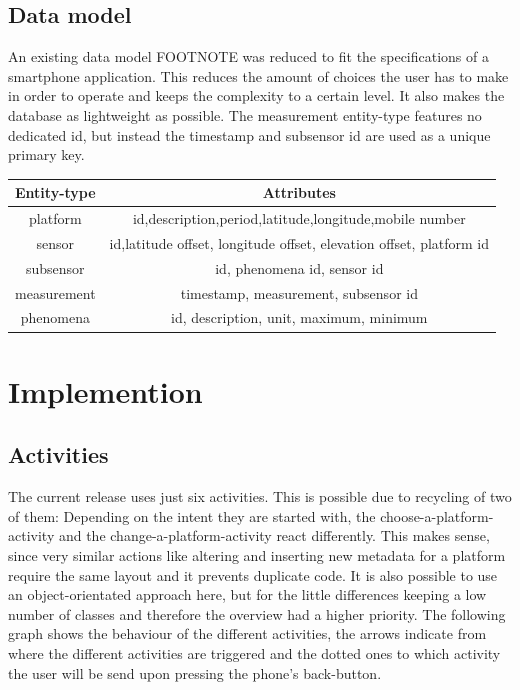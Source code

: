 \documentclass[11pt,oneside,a4paper]{scrartcl}
\begin{document}
\subsection{Data model}
An existing data model  FOOTNOTE was reduced to fit the specifications of a smartphone application. This reduces the amount of choices the user has to make in order to operate and keeps the complexity to a certain level. It also makes the database as lightweight as possible. The measurement entity-type features no dedicated id, but instead the timestamp and subsensor id are used as a unique primary key.

\begin{center}
\begin{tabular}{|c|c|}
\hline \textbf{ Entity-type} &  \textbf{Attributes} \\ 
\hline platform & id,description,period,latitude,longitude,mobile number \\ 
\hline sensor & id,latitude offset, longitude offset, elevation offset, platform id \\ 
\hline subsensor & id, phenomena id, sensor id \\ 
\hline measurement & timestamp, measurement, subsensor id \\ 
\hline phenomena & id, description, unit, maximum, minimum \\ 
\hline 
\end{tabular} 
\end{center}


\section{Implemention}
\subsection{Activities}
The current release uses just six activities. This is possible due to recycling of two of them: Depending on the intent they are started with, the choose-a-platform-activity and the change-a-platform-activity react differently. This makes sense, since very similar actions like altering and inserting new metadata for a platform require the same layout and it prevents duplicate code. It is also possible to use an object-orientated approach here, but for the little differences keeping a low number of classes and therefore the overview had a higher priority.
The following graph shows the behaviour of the different activities, the arrows indicate from where the different activities are triggered and the dotted ones to which activity the user will be send upon pressing the phone's back-button.
\end{document}
